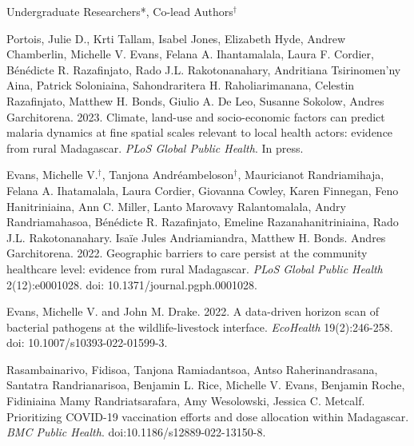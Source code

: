 


\bigskip
Undergraduate Researchers*, Co-lead Authors$^\dagger$

\smallskip

\begin{etaremune}

\item Portois, Julie D., Krti Tallam, Isabel Jones, Elizabeth Hyde, Andrew Chamberlin, \textcolor{awesome}{Michelle V. Evans}, Felana A. Ihantamalala, Laura F. Cordier, B\'{e}n\'{e}dicte R. Razafinjato, Rado J.L. Rakotonanahary, Andritiana Tsirinomen'ny Aina, Patrick Soloniaina, Sahondraritera H. Raholiarimanana, Celestin Razafinjato, Matthew H. Bonds, Giulio A. De Leo, Susanne Sokolow, Andres Garchitorena. 2023. Climate, land-use and socio-economic factors can predict malaria dynamics at fine spatial scales relevant to local health actors: evidence from rural Madagascar. \textit{PLoS Global Public Health}. In press. \smallskip

\item \textcolor{awesome}{Evans, Michelle V.}$^\dagger$, Tanjona Andr\'{e}ambeloson$^\dagger$, Mauricianot Randriamihaja, Felana A. Ihatamalala, Laura Cordier, Giovanna Cowley, Karen Finnegan, Feno Hanitriniaina, Ann C. Miller, Lanto Marovavy Ralantomalala, Andry Randriamahasoa, B\'{e}n\'{e}dicte R. Razafinjato, Emeline Razanahanitriniaina, Rado J.L. Rakotonanahary. Isa\"{i}e Jules Andriamiandra, Matthew H. Bonds. Andres Garchitorena. 2022. Geographic barriers to care persist at the community healthcare level: evidence from rural Madagascar. \textit{PLoS Global Public Health} 2(12):e0001028. doi: 10.1371/journal.pgph.0001028. \smallskip

\item \textcolor{awesome}{Evans, Michelle V.} and John M. Drake. 2022. A data-driven horizon scan of bacterial pathogens at the wildlife-livestock interface. \textit{EcoHealth} 19(2):246-258. doi: 10.1007/s10393-022-01599-3. \smallskip

\item Rasambainarivo, Fidisoa, Tanjona Ramiadantsoa, Antso Raherinandrasana, Santatra Randrianarisoa, Benjamin L. Rice, \textcolor{awesome}{Michelle V. Evans}, Benjamin Roche, Fidiniaina Mamy Randriatsarafara, Amy Wesolowski, Jessica C. Metcalf. Prioritizing COVID-19 vaccination efforts and dose allocation within Madagascar. \textit{BMC Public Health}. doi:10.1186/s12889-022-13150-8. \smallskip


\end{etaremune}
